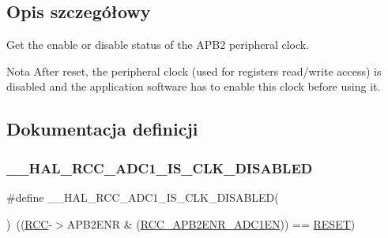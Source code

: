 \subsection{Opis szczegółowy}
Get the enable or disable status of the A\+P\+B2 peripheral clock. 

\begin{DoxyNote}{Nota}
After reset, the peripheral clock (used for registers read/write access) is disabled and the application software has to enable this clock before using it. 
\end{DoxyNote}


\subsection{Dokumentacja definicji}
\mbox{\label{group___r_c_c___a_p_b2___peripheral___clock___enable___disable___status_gac9f006a3c1b75c06270f0ae5a2c3ed07}} 
\subsubsection{\texorpdfstring{\+\_\+\+\_\+\+H\+A\+L\+\_\+\+R\+C\+C\+\_\+\+A\+D\+C1\+\_\+\+I\+S\+\_\+\+C\+L\+K\+\_\+\+D\+I\+S\+A\+B\+L\+ED}{\_\_HAL\_RCC\_ADC1\_IS\_CLK\_DISABLED}}
{\footnotesize\ttfamily \#define \+\_\+\+\_\+\+H\+A\+L\+\_\+\+R\+C\+C\+\_\+\+A\+D\+C1\+\_\+\+I\+S\+\_\+\+C\+L\+K\+\_\+\+D\+I\+S\+A\+B\+L\+ED(\begin{DoxyParamCaption}{ }\end{DoxyParamCaption})~((\hyperlink{group___peripheral__declaration_ga74944438a086975793d26ae48d5882d4}{R\+CC}-\/$>$A\+P\+B2\+E\+NR \& (\hyperlink{group___peripheral___registers___bits___definition_ga57b9f50cb96a2e4ceba37728b4a32a42}{R\+C\+C\+\_\+\+A\+P\+B2\+E\+N\+R\+\_\+\+A\+D\+C1\+EN})) == \hyperlink{group___exported__types_gga89136caac2e14c55151f527ac02daaffa589b7d94a3d91d145720e2fed0eb3a05}{R\+E\+S\+ET})}



